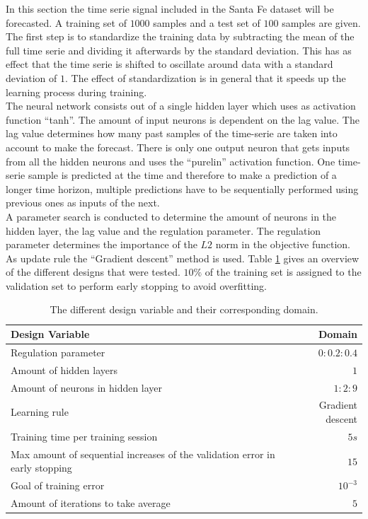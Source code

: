 \documentclass[a4paper,10pt]{article}
\begin{document}
In this section the time serie  signal included in the Santa Fe dataset will be forecasted. A training set of $ 1000 $ samples and a test set of $ 100 $ samples are given. The first step is to standardize the training data by subtracting the mean of the full time serie and dividing it afterwards by the standard deviation. This has as effect that the time serie is shifted to oscillate around data with a standard deviation of $ 1 $. The effect of standardization is in general that it speeds up the learning process during training. \\
The neural network consists out of a single hidden layer which uses as activation function ``tanh''. The amount of input neurons is dependent on the lag value. The lag value determines how many past samples of the time-serie are taken into account to make the forecast. There is only one output neuron that gets inputs from all the hidden neurons and uses the ``purelin'' activation function. One time-serie sample is predicted at the time and therefore to make a prediction of a longer time horizon, multiple predictions have to be sequentially performed using previous ones as inputs of the next.\\

A parameter search is conducted to determine the amount of neurons in the hidden layer, the lag value and the regulation parameter. The regulation parameter determines the importance of the $ L2 $ norm in the objective function. As update rule the ``Gradient descent'' method is used. Table \ref{tab:design} gives an overview of the different designs that were tested. $ 10\% $ of the training set is assigned to the validation set to perform early stopping to avoid overfitting.\\

\begin{table}
	\centering
	\begin{tabular}{@{}lr@{}} \toprule
		\textbf{Design Variable}    & Domain \\\midrule
		Regulation parameter & $ 0:0.2:0.4 $ \\ 
		Amount of hidden layers & $ 1 $\\
		Amount of neurons in hidden layer & $ 1:2:9 $  \\
		Learning rule & Gradient descent\\
		Training time per training session & $ 5 s $\\
		Max amount of sequential increases of the validation error in early stopping & $ 15 $\\
		Goal of training error & $ 10^{-3} $\\
		Amount of iterations to take average & $ 5 $\\\bottomrule
	\end{tabular}
	\caption{The different design variable and their corresponding domain.}
	\label{tab:design}
\end{table}  
\end{document}
